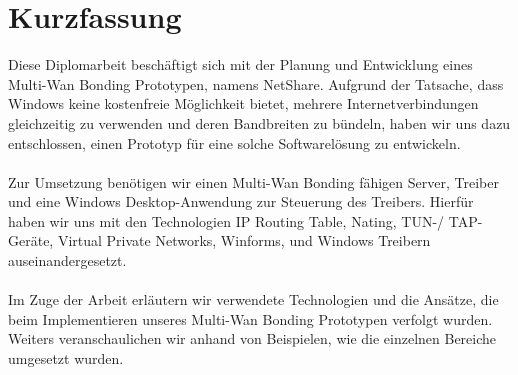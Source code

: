 \chapter{Kurzfassung}

Diese Diplomarbeit beschäftigt sich mit der Planung und Entwicklung eines Multi-Wan Bonding Prototypen, namens NetShare. Aufgrund der Tatsache, dass Windows keine kostenfreie Möglichkeit bietet, mehrere Internetverbindungen gleichzeitig zu verwenden und deren Bandbreiten zu bündeln, haben wir uns dazu entschlossen, einen Prototyp für eine solche Softwarelösung zu entwickeln.
\\\\
Zur Umsetzung benötigen wir einen Multi-Wan Bonding fähigen Server, Treiber und eine Windows Desktop-Anwendung zur Steuerung des Treibers. Hierfür haben wir uns mit den Technologien IP Routing Table, Nating, TUN-/ TAP-Geräte, Virtual Private Networks, Winforms, und Windows Treibern auseinandergesetzt.
\\\\
Im Zuge der Arbeit erläutern wir verwendete Technologien und die Ansätze, die beim Implementieren unseres Multi-Wan Bonding Prototypen verfolgt wurden. Weiters veranschaulichen wir anhand von Beispielen, wie die einzelnen Bereiche umgesetzt wurden. 